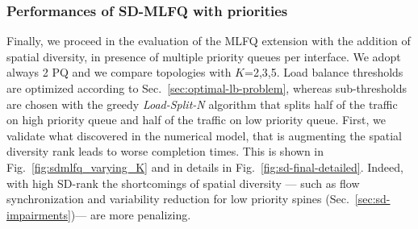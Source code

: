 \subsubsection{Performances of SD-MLFQ with priorities}
Finally, we proceed in the evaluation of the MLFQ extension with the addition of spatial diversity, in presence of multiple priority queues per interface. We adopt always 2 PQ and we compare topologies with $K$=2,3,5. Load balance thresholds are optimized according to Sec.~\ref{sec:optimal-lb-problem}, whereas sub-thresholds are chosen with the greedy \textit{Load-Split-N} algorithm that splits half of the traffic on high priority queue and half of the traffic on low priority queue. First, we validate what discovered in the numerical model, that is augmenting the spatial diversity rank leads to worse completion times. This is shown in Fig.~\ref{fig:sdmlfq_varying_K} and in details in Fig.~\ref{fig:sd-final-detailed}. Indeed, with high SD-rank the shortcomings of spatial diversity --- such as flow synchronization and variability reduction for low priority spines (Sec.~\ref{sec:sd-impairments})--- are more penalizing.

